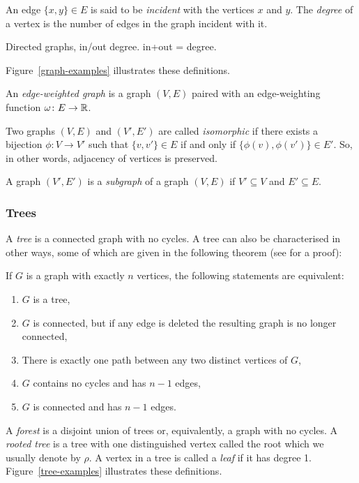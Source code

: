An edge $\{x,y\} \in E$ is said to be \textit{incident} with the vertices $x$
and $y$.  The \textit{degree} of a vertex is the number of edges in the graph
incident with it.

Directed graphs, in/out degree. in+out = degree.

Figure~\ref{graph-examples} illustrates these definitions.

An \textit{edge-weighted graph} is a graph $(V,E)$ paired with an
edge-weighting function $\omega \colon E \to {\mathbb R}$.

Two graphs $(V,E)$ and $(V',E')$ are called \textit{isomorphic} if there
exists a bijection $\phi \colon V \to V'$ such that $\{v,v'\} \in E$ if and
only if $\{\phi(v),\phi(v')\} \in E'$.  So, in other words, adjacency of
vertices is preserved.

A graph $(V',E')$ is a \textit{subgraph} of a graph $(V,E)$ if $V' \subseteq
V$ and $E' \subseteq E$.

\subsubsection{Trees}
\label{sec:trees}

A \textit{tree} is a connected graph with no cycles.  A tree can also be
characterised in other ways, some of which are given in the following theorem
(see \citep[][section 2.3.4.1]{knuth97taocp1} for a proof):

\begin{thm}
  If $G$ is a graph with exactly $n$ vertices, the following statements are
  equivalent:
  \begin{enumerate}[label=\alph*)]
  \item $G$ is a tree,
  \item $G$ is connected, but if any edge is deleted the resulting graph is no
    longer connected,
  \item There is exactly one path between any two distinct vertices of $G$,
  \item $G$ contains no cycles and has $n-1$ edges,
  \item $G$ is connected and has $n-1$ edges.
  \end{enumerate}
\end{thm}

A \textit{forest} is a disjoint union of trees or, equivalently, a graph with
no cycles.  A \textit{rooted tree} is a tree with one distinguished vertex
called the root which we usually denote by $\rho$.  A vertex in a tree is
called a \textit{leaf} if it has degree 1.  Figure~\ref{tree-examples}
illustrates these definitions.

